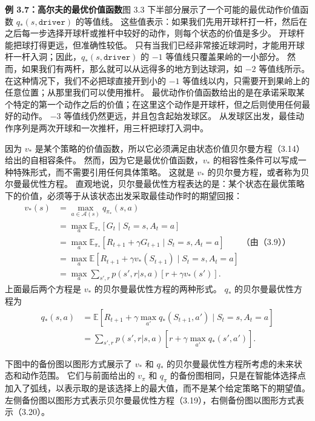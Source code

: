 \documentclass[UTF8, 12pt, fontset=fandol, oneside]{ctexart}
\begin{document}
\noindent\textbf{例 3.7：高尔夫的最优价值函数}\quad 图 3.3 下半部分展示了一个可能的最优动作价值函数 $q_*(s,\texttt{driver})$ 的等值线。
这些值表示：如果我们先用开球杆打一杆，然后在之后每一步选择开球杆或推杆中较好的动作，则每个状态的价值是多少。
开球杆能把球打得更远，但准确性较低。
只有当我们已经非常接近球洞时，才能用开球杆一杆入洞；因此，$q_*(s,\texttt{driver})$ 的 $-1$ 等值线只覆盖果岭的一小部分。
然而，如果我们有两杆，那么就可以从远得多的地方到达球洞，如 $-2$ 等值线所示。
在这种情况下，我们不必把球直接开到小的 $-1$ 等值线以内，只需要开到果岭上的任意位置；从那里我们可以使用推杆。
最优动作价值函数给出的是在承诺采取某个特定的第一个动作之后的价值；在这里这个动作是开球杆，但之后则使用任何最好的动作。
$-3$ 等值线仍然更远，并且包含起始发球区。
从发球区出发，最佳动作序列是两次开球和一次推杆，用三杆把球打入洞中。

因为 $v_*$ 是某个策略的价值函数，所以它必须满足由状态价值贝尔曼方程（3.14）给出的自相容条件。
然而，因为它是最优价值函数，$v_*$ 的相容性条件可以写成一种特殊形式，而不需要引用任何具体策略。
这就是 $v_*$ 的贝尔曼方程，或者称为贝尔曼最优性方程。
直观地说，贝尔曼最优性方程表达的是：某个状态在最优策略下的价值，必须等于从该状态出发采取最佳动作时的期望回报：
\begin{equation}
\begin{aligned}
v_*(s)
&= \max_{a\in\mathcal{A}(s)}q_{\pi_*}(s,a)\\
&= \max_a \mathbb{E}_{\pi_*}[G_t\mid S_t=s,A_t=a]\\
&= \max_a \mathbb{E}_{\pi_*}[R_{t+1}+\gamma G_{t+1}\mid S_t=s,A_t=a]\qquad \text{（由（3.9））}\\
&= \max_a \mathbb{E}[R_{t+1}+\gamma v_*(S_{t+1})\mid S_t=s,A_t=a]\\
&= \max_a \sum_{s',r}p(s',r|s,a)\left[r+\gamma v_*(s')\right].
\end{aligned}
\tag{3.19}
\end{equation}
上面最后两个方程是 $v_*$ 的贝尔曼最优性方程的两种形式。
$q_*$ 的贝尔曼最优性方程为
\begin{equation}
\begin{aligned}
q_*(s,a)
&= \mathbb{E}\left[R_{t+1}+\gamma\max_{a'}q_*(S_{t+1},a')\mid S_t=s,A_t=a\right]\\
&= \sum_{s',r}p(s',r|s,a)\left[r+\gamma\max_{a'}q_*(s',a')\right].
\end{aligned}
\tag{3.20}
\end{equation}

下图中的备份图以图形方式展示了 $v_*$ 和 $q_*$ 的贝尔曼最优性方程所考虑的未来状态和动作范围。
它们与前面给出的 $v_\pi$ 和 $q_\pi$ 的备份图相同，只是在智能体选择点加入了弧线，以表示取的是该选择上的最大值，而不是某个给定策略下的期望值。
左侧备份图以图形方式表示贝尔曼最优性方程（3.19），右侧备份图以图形方式表示（3.20）。
\end{document}
